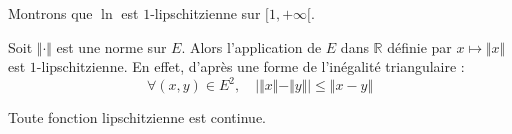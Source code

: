 \documentclass[a4paper,10pt]{report}
\begin{document}
\medskip

\begin{exems}
\item Montrons que $\ln$ est $1$-lipschitzienne sur $[1, + \infty[$.

\medskip

\vspace{5cm}
%
\item Soit $\Vert \cdot \Vert$ est une norme sur $E$. Alors l'application de $E$ dans $\mathbb{R}$ définie par $x \mapsto \Vert x \Vert$ est $1$-lipschitzienne. En effet, d'après une forme de l'inégalité triangulaire :
$$ \forall (x,y) \in E^2, \quad \vert \Vert x \Vert - \Vert y \Vert \vert \leq \Vert x -y \Vert $$
\end{exems}

\begin{Theoreme}{} Toute fonction lipschitzienne est continue. 
\end{Theoreme}

\begin{Demonstration}{} 
%
%
%

\vspace{4cm}
\end{Demonstration}
\end{document}
